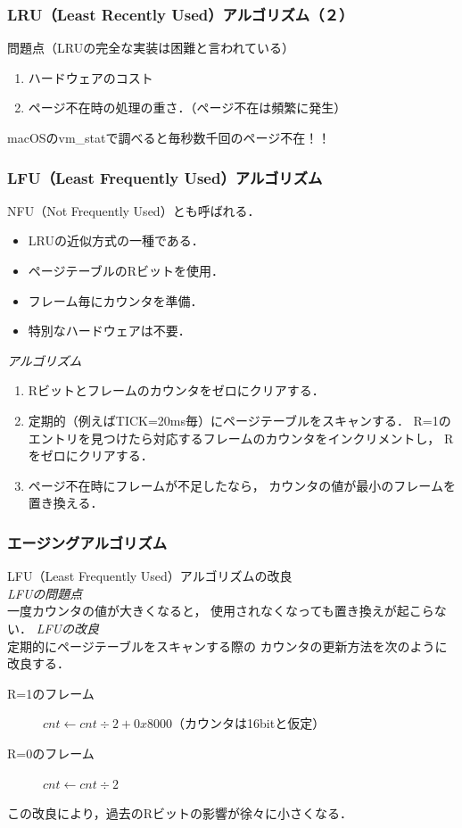 \documentclass[unicode,handout]{beamer}                   %
\begin{document}
\begin{frame}
  \frametitle{LRU（Least Recently Used）アルゴリズム（２）}
  \vspace{3mm}問題点（LRUの完全な実装は困難と言われている）\\
  \begin{enumerate}
  \item[1.] ハードウェアのコスト
  \item[2.] ページ不在時の処理の重さ．（ページ不在は頻繁に発生）
  \end{enumerate}
  macOSのvm\_statで調べると毎秒数千回のページ不在！！
\end{frame}

\begin{frame}
  \frametitle{LFU（Least Frequently Used）アルゴリズム}
  NFU（Not Frequently Used）とも呼ばれる．
  \begin{itemize}
  \item LRUの近似方式の一種である．
  \item ページテーブルのRビットを使用．
  \item フレーム毎にカウンタを準備．
  \item 特別なハードウェアは不要．
  \end{itemize}
  \vfill
  \emph{アルゴリズム}
  \begin{enumerate}
  \item[1.] Rビットとフレームのカウンタをゼロにクリアする．
  \item[2.] 定期的（例えばTICK=20ms毎）にページテーブルをスキャンする．
    R=1のエントリを見つけたら対応するフレームのカウンタをインクリメントし，
    Rをゼロにクリアする．
  \item[3.] ページ不在時にフレームが不足したなら，
    カウンタの値が最小のフレームを置き換える．
  \end{enumerate}
\end{frame}

\begin{frame}
  \frametitle{エージングアルゴリズム}
  LFU（Least Frequently Used）アルゴリズムの改良\\
  \vfill
  \emph{LFUの問題点}\\
  一度カウンタの値が大きくなると，
  使用されなくなっても置き換えが起こらない．
  \vfill
  \emph{LFUの改良}\\
  定期的にページテーブルをスキャンする際の
  カウンタの更新方法を次のように改良する．
  \begin{description}
  \item[R=1のフレーム]
    $cnt \leftarrow cnt \div 2 + 0x8000$（カウンタは16bitと仮定）
  \item[R=0のフレーム]
    $cnt \leftarrow cnt \div 2$
  \end{description}
  この改良により，過去のRビットの影響が徐々に小さくなる．
\end{frame}
\end{document}
